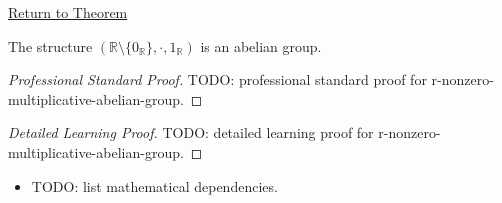 \newpage
{}
\label{prf:r-nonzero-multiplicative-abelian-group}

\begin{remark*}[Return]
\hyperref[thm:r-nonzero-multiplicative-abelian-group]{Return to Theorem}
\end{remark*}

\begin{theorem*}
The structure $(\mathbb{R}\setminus\{0_{\mathbb{R}}\},\cdot,1_{\mathbb{R}})$
is an abelian group.
\end{theorem*}

\begin{proof}[Professional Standard Proof]
\LRAProofBodyStart
TODO: professional standard proof for r-nonzero-multiplicative-abelian-group.
\end{proof}

\begin{proof}[Detailed Learning Proof]
\LRAProofBodyStart
TODO: detailed learning proof for r-nonzero-multiplicative-abelian-group.
\end{proof}

\begin{remark*}
\end{remark*}

\begin{dependencies}
\begin{itemize}
  \item TODO: list mathematical dependencies.
\end{itemize}
\end{dependencies}

\clearpage
